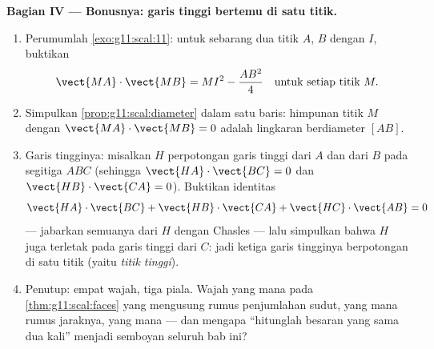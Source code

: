 \begin{problem}
\medskip
\noindent\textbf{Bagian IV --- Bonusnya: garis tinggi bertemu di satu titik.}
\begin{enumerate}[resume]
  \item Perumumlah \cref{exo:g11:scal:11}: untuk sebarang dua titik
        $A$, $B$ dengan  $I$, buktikan
        \[
        \vect{MA} \cdot \vect{MB} = MI^2 - \frac{AB^2}{4}
        \quad\text{untuk setiap titik } M .
        \]
  \item Simpulkan \cref{prop:g11:scal:diameter} dalam satu baris:
        himpunan titik $M$ dengan
        $\vect{MA} \cdot \vect{MB} = 0$ adalah lingkaran
        berdiameter $[AB]$.
  \item Garis tingginya: misalkan $H$ perpotongan
        garis tinggi dari $A$ dan dari $B$ pada segitiga $ABC$
        (sehingga $\vect{HA} \cdot \vect{BC} = 0$ dan
        $\vect{HB} \cdot \vect{CA} = 0$). Buktikan identitas
        \[
        \vect{HA} \cdot \vect{BC} + \vect{HB} \cdot \vect{CA}
        + \vect{HC} \cdot \vect{AB} = 0
        \]
        --- jabarkan semuanya dari $H$ dengan Chasles --- lalu
        simpulkan bahwa $H$ juga terletak pada garis tinggi dari $C$:
        jadi ketiga garis tingginya berpotongan di satu titik (yaitu
        \emph{titik tinggi}).
  \item Penutup: empat wajah, tiga piala. Wajah yang mana pada
        \cref{thm:g11:scal:faces} yang mengusung rumus penjumlahan sudut,
        yang mana rumus jaraknya, yang mana  ---
        dan mengapa ``hitunglah besaran yang sama dua kali'' menjadi semboyan
        seluruh bab ini?

\end{enumerate}
\end{problem}
